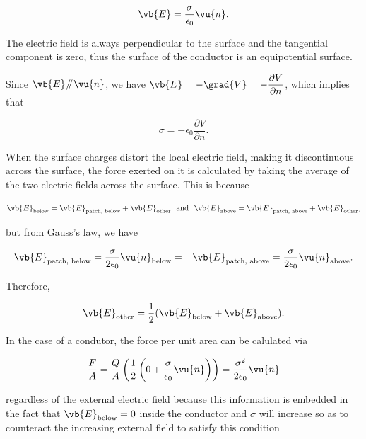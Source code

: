 \documentclass[english,a4paper,12pt]{report}
\begin{document}
\begin{equation}
    \vb{E} = \frac{\sigma }{\epsilon_0} \vu{n}. 
\end{equation}

The electric field is always perpendicular to the surface and the tangential component is zero, thus the surface of the conductor is an equipotential surface.

Since \(\vb{E} \mathbin{\!/\mkern-5mu/\!} \vu{n} \), we have \(\displaystyle \vb{E} = - \grad{V} = - \frac{\partial V}{\partial n} \), which implies that 

\begin{equation}
    \sigma = -\epsilon _{0}\frac{\partial V}{\partial n}.  
\end{equation}

When the surface charges distort the local electric field, making it discontinuous across the surface, the force exerted on it is calculated by taking the average of the two electric fields across the surface. This is because

\begin{equation}
    \vb{E} _{\text{below} } = \vb{E} _{\text{patch, below} } + \vb{E} _{\text{other} } ~\text { and }~ \vb{E} _{\text{above} } = \vb{E} _{\text{patch, above} } + \vb{E} _{\text{other} },  
\end{equation}

but from Gauss's law, we have

\begin{equation}
    \vb{E} _{\text{patch, below} } = \frac{\sigma }{2 \epsilon _0}\vu{n} _{\text{below} } = - \vb{E} _{\text{patch, above} } = \frac{\sigma }{2 \epsilon _0}\vu{n} _{\text{above} }.    
\end{equation}

Therefore, 

\begin{equation}
    \vb{E} _{\text{other} } = \frac{1}{2}(\vb{E} _{\text{below} } + \vb{E} _{\text{above} }  ).   
\end{equation}

In the case of a condutor, the force per unit area can be calulated via

\begin{equation}
    \frac{F}{A} = \frac{Q}{A}\left( \frac{1}{2} \left( 0 + \frac{\sigma }{\epsilon _{0} }\vu{n}   \right)  \right) = \frac{\sigma ^2}{2\epsilon _{0} }\vu{n}
\end{equation}

regardless of the external electric field because this information is embedded in the fact that \(\vb{E} _{\text{below} } = 0 \) inside the conductor and \(\sigma \) will increase so as to counteract the increasing external field to satisfy this condition  
\end{document}
